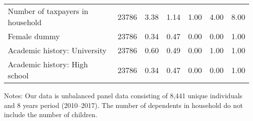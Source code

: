 \begin{table}
\begin{threeparttable}
\begin{tabular}[t]{lcccccc}
\hspace{1em}Number of taxpayers in household & 23786 & \num{3.38} & \num{1.14} & \num{1.00} & \num{4.00} & \num{8.00}\\
\hspace{1em}Female dummy & 23786 & \num{0.34} & \num{0.47} & \num{0.00} & \num{0.00} & \num{1.00}\\
\hspace{1em}Academic history: University & 23786 & \num{0.60} & \num{0.49} & \num{0.00} & \num{1.00} & \num{1.00}\\
\hspace{1em}Academic history: High school & 23786 & \num{0.34} & \num{0.47} & \num{0.00} & \num{0.00} & \num{1.00}\\
\bottomrule
\end{tabular}
\begin{tablenotes}
\item Notes: Our data is unbalanced panel data consisting of 8,441 unique individuals and 8 years period (2010--2017). The number of dependents in household do not include the number of children.
\end{tablenotes}
\end{threeparttable}
\end{table}
